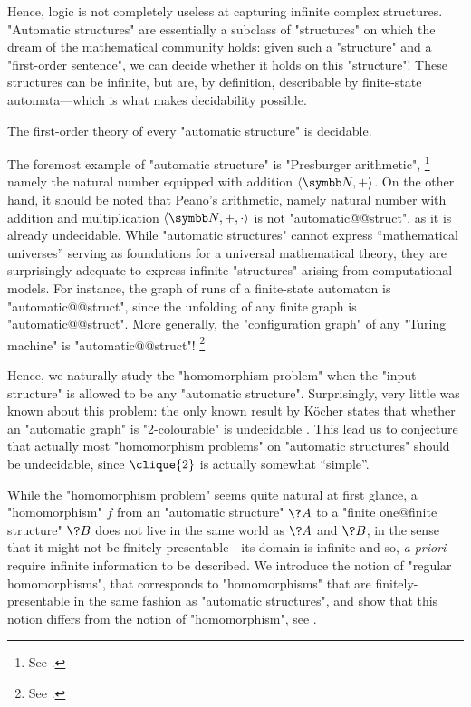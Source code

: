 Hence, logic is not completely useless at capturing infinite complex structures.
"Automatic structures" are essentially a subclass of "structures" on which the dream of
the mathematical community holds: given such a "structure" and a "first-order sentence",
we can decide whether it holds on this "structure"! These structures can be infinite,
but are, by definition, describable by finite-state automata---which is what
makes decidability possible.

\begin{known}
	The first-order theory of every "automatic structure" is decidable.
\end{known}

The foremost example of "automatic structure" is "Presburger arithmetic",%
\footnote{See .}
namely the natural number equipped with addition $\tup{\N, +}$.
On the other hand, it should be noted that Peano's arithmetic, namely natural number with
addition and multiplication $\tup{\N,+,\cdot}$ is not "automatic@@struct",
as it is already undecidable.
While "automatic structures" cannot express ``mathematical universes'' serving as
foundations for a universal mathematical theory, they are surprisingly adequate to
express infinite "structures" arising from computational models.
For instance, the graph of runs of a finite-state automaton is "automatic@@struct",
since the unfolding of any finite graph is "automatic@@struct".
More generally, the "configuration graph" of any "Turing machine" is "automatic@@struct"!%
\footnote{See .}

Hence, we naturally study the "homomorphism problem" when the "input structure"
is allowed to be any "automatic structure". Surprisingly, very little was known about this problem:
the only known result by Köcher states that whether an "automatic graph" is "2-colourable" is undecidable \cite{Kocher2014AutomatischenGraphen}.
This lead us to conjecture that actually most "homomorphism problems" on "automatic structures"
should be undecidable, since $\clique{2}$ is actually somewhat ``simple''.

While the "homomorphism problem" seems quite natural at first glance, a "homomorphism" $f$
from an "automatic structure" $\?A$ to a "finite one@finite structure" $\?B$ does not live
in the same world as $\?A$ and $\?B$, in the sense that it might not be finitely-presentable---its domain is infinite and so, \emph{a priori} require infinite information to be described.
We introduce the notion of "regular homomorphisms", that corresponds to "homomorphisms" that
are finitely-presentable in the same fashion as "automatic structures", and show that
this notion differs from the notion of "homomorphism",
see .

